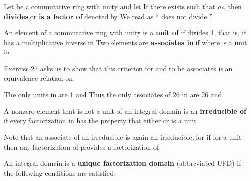 \documentclass[11pt,oneside]{article}
\begin{document}
\begin{BookBody}

 Let  be a commutative ring with unity and let  If there exists  such that  \textit{ac}, then  \textbf{divides} or  \textbf{is a factor of}  denoted by  We read  as “ does not divide ” \BookEnd{\blacksquare}

 An element  of a commutative ring with unity  is a\textbf{ unit of}  if  divides 1, that is, if  has a multiplicative inverse in  Two elements  are\textbf{ associates in}  if  where  is a unit in 

Exercise 27 asks us to show that this criterion for  and  to be associates is an equivalence relation on \BookEnd{\blacksquare}

 The only units in  are 1 and  Thus the only associates of 26 in  are 26 and \BookEnd{\blacktriangle}

 A nonzero element  that is not a unit of an integral domain  is an\textbf{ irreducible of}  if every factorization  in  has the property that either  or  is a unit\BookEnd{\blacksquare}

Note that an associate of an irreducible  is again an irreducible, for if  for a unit  then any factorization of  provides a factorization of 

 An integral domain  is a\textbf{ unique factorization domain} (abbreviated UFD) if the following conditions are satisfied:




\end{BookBody}
\end{document}
